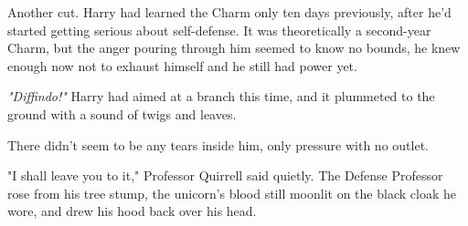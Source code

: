 Another cut. Harry had learned the Charm only ten days previously, after he'd
started getting serious about self-defense. It was theoretically a second-year
Charm, but the anger pouring through him seemed to know no bounds, he knew
enough now not to exhaust himself and he still had power yet.

\emph{"Diffindo!"} Harry had aimed at a branch this time, and it plummeted to
the ground with a sound of twigs and leaves.

There didn't seem to be any tears inside him, only pressure with no outlet.

"I shall leave you to it," Professor Quirrell said quietly. The Defense
Professor rose from his tree stump, the unicorn's blood still moonlit on the
black cloak he wore, and drew his hood back over his head.
